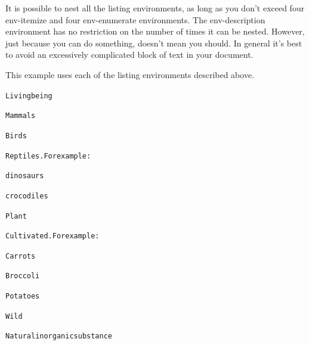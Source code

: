 It is possible to nest all the listing environments, as long as you
don't exceed four \gls{env-itemize} and four \gls{env-enumerate}
environments. The \gls{env-description} environment has no
restriction on the number of times it can be nested. However, just
because you can do something, doesn't mean you should. In general
it's best to avoid an excessively complicated block of text in your
document.


This example uses each of the listing environments described above.

\bookpagebreak
\begin{code}
\begin{alltt}

    Living being


       Mammals

       Birds

       Reptiles. For example:


          dinosaurs

          crocodiles



    Plant


       Cultivated. For example:


          Carrots

          Broccoli

          Potatoes


       Wild


    Natural inorganic substance

\end{alltt}
\end{code}

